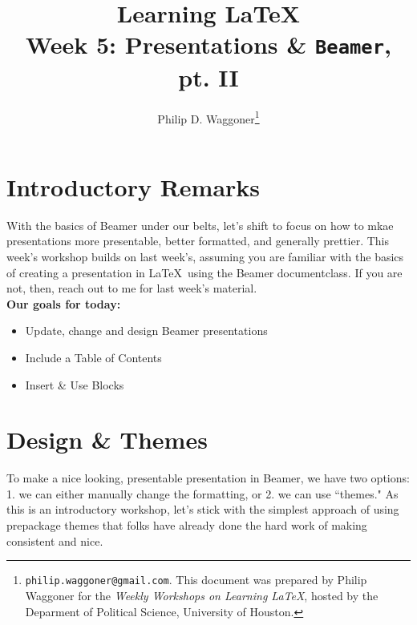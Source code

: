 \documentclass[11pt]{article}
\newcommand{\forceindent}{\leavevmode{\parindent=1.5em\indent}} %
\begin{document}
	
	\title{Learning \LaTeX \\
		\vspace{1cm}
	\large Week 5: Presentations \& \texttt{Beamer}, pt. II \\ %
		\vspace{1cm}}
	\author{Philip D. Waggoner\footnote{{\texttt{philip.waggoner@gmail.com}}. This document was prepared by Philip Waggoner for the \textit{Weekly Workshops on Learning \LaTeX}, hosted by the Deparment of Political Science, University of Houston.}}
	\date{ } %
	\maketitle

\newpage

\tableofcontents

\newpage

\section{Introductory Remarks}
	
\forceindent With the basics of Beamer under our belts, let's shift to focus on how to mkae presentations more presentable, better formatted, and generally prettier. This week's workshop builds on last week's, assuming you are familiar with the basics of creating a presentation in \LaTeX\ using the Beamer documentclass. If you are not, then, reach out to me for last week's material. \\

\textbf{Our goals for today:}
\begin{itemize}
	\item Update, change and design Beamer presentations
	\item Include a Table of Contents
	\item Insert \& Use Blocks
\end{itemize}

\newpage


\section{Design \& Themes}

\forceindent To make a nice looking, presentable presentation in Beamer, we have two options: 1. we can either manually change the formatting, or 2. we can use ``themes." As this is an introductory workshop, let's stick with the simplest approach of using prepackage themes that folks have already done the hard work of making consistent and nice.  \\
\end{document}
